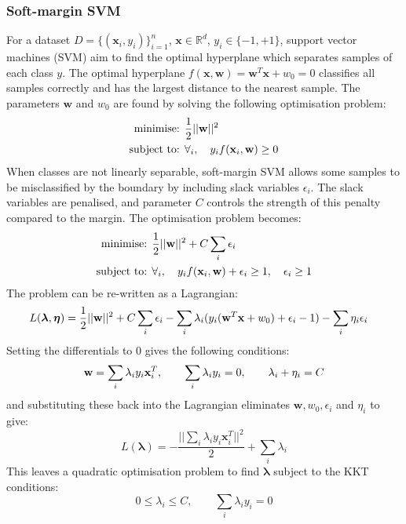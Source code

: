 \begin{appendices}
\subsubsection{Soft-margin SVM}
For a dataset $D=\{(\textbf{x}_i, y_i)\}_{i=1}^n$, $\textbf{x} \in \mathbb{R}^d$, $y_i \in \{-1, +1\}$, support vector machines (SVM) aim to find the optimal hyperplane which separates samples of each class $y$. The optimal hyperplane $f(\textbf{x}, \textbf{w}) = \textbf{w}^T \textbf{x} + w_0 = 0$ classifies all samples correctly and has the largest distance to the nearest sample. The parameters $\textbf{w}$ and $w_0$ are found by solving the following optimisation problem:
\begin{align}
\text{minimise: } & \frac{1}{2} || \textbf{w} ||^2 \notag \\
\text{subject to: } &\forall_i, \quad y_i f(\textbf{x}_i, \textbf{w}) \geq 0 \notag
\end{align}
When classes are not linearly separable, soft-margin SVM allows some samples to be misclassified by the boundary by including slack variables $\epsilon_i$. The slack variables are penalised, and parameter $C$ controls the strength of this penalty compared to the margin. The optimisation problem becomes:
\begin{align}
\text{minimise: } & \frac{1}{2} || \textbf{w} ||^2 + C \sum_i \epsilon_i \notag \\
\text{subject to: } &\forall_i, \quad y_i f(\textbf{x}_i, \textbf{w}) + \epsilon_i \geq 1, \quad\epsilon_i \geq 1 \notag
\end{align}
The problem can be re-written as a Lagrangian:
\begin{align}
L(\boldsymbol{\lambda}, \boldsymbol{\eta}) 
	&= \frac{1}{2} ||\textbf{w}||^2 
	+ C \sum_i \epsilon_i 
	- \sum_i \lambda_i (y_i (\textbf{w}^T \textbf{x} + w_0) + \epsilon_i - 1) 
	- \sum_i \eta_i \epsilon_i 
	\notag
\end{align}
Setting the differentials to 0 gives the following conditions:
\begin{align}
\textbf{w} = \sum_i \lambda_i y_i \textbf{x}_i^T,
	\qquad
\sum_i \lambda_i y_i = 0,
	\qquad
\lambda_i + \eta_i = C \notag
\end{align}
and substituting these back into the Lagrangian eliminates $\textbf{w}, w_0, \epsilon_i$ and $\eta_i$ to give:
$$L(\boldsymbol{\lambda}) = - \dfrac{||\sum_i \lambda_i y_i \textbf{x}_i^T||^2}{2}
	+ \sum_i \lambda_i$$
This leaves a quadratic optimisation problem to find $\boldsymbol{\lambda}$ subject to the KKT conditions:
$$0 \leq \lambda_i \leq C, \qquad \sum_i \lambda_i y_i = 0$$

\end{appendices}
